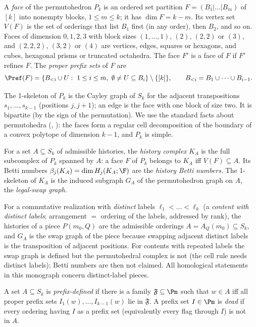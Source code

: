 \begin{definition}\label{def:faces}
A \emph{face} of the permutohedron $P_k$ is an ordered set partition $F=(B_1|\dots|B_m)$ of $[k]$ into nonempty blocks, $1\le m\le k$; it has $\dim F=k-m$. Its vertex set $V(F)$ is the set of orderings that list $B_1$ first (in any order), then $B_2$, and so on. Faces of dimension $0,1,2,3$ with block sizes $(1,\dots,1)$, $(2)$, $(2,2)$ or $(3)$, and $(2,2,2)$, $(3,2)$ or $(4)$ are vertices, edges, squares or hexagons, and cubes, hexagonal prisms or truncated octahedra. The face $F'$ is a face of $F$ if $F'$ refines $F$. The \emph{proper prefix sets} of $F$ are
\[
\Pref(F)=\{B_{<i}\cup U:\ 1\le i\le m,\ \emptyset\neq U\subseteq B_i\}\setminus\{[k]\},\qquad B_{<i}=B_1\cup\dots\cup B_{i-1}.
\]
\end{definition}
\noindent The 1-skeleton of $P_k$ is the Cayley graph of $S_k$ for the adjacent transpositions $s_1,\dots,s_{k-1}$ (positions $j,j{+}1$); an edge is the face with one block of size two. It is bipartite (by the sign of the permutation). We use the standard facts about permutohedra (\cite{Ziegler}, \cite{BjornerBrenti}): the faces form a regular cell decomposition of the boundary of a convex polytope of dimension $k-1$, and $P_k$ is simple.

\begin{definition}\label{def:KA}
For a set $A\subseteq S_k$ of admissible histories, the \emph{history complex} $K_A$ is the full subcomplex of $P_k$ spanned by $A$: a face $F$ of $P_k$ belongs to $K_A$ iff $V(F)\subseteq A$. Its Betti numbers $\beta_j(K_A)=\dim H_j(K_A;\F)$ are the \emph{history Betti numbers}. The 1-skeleton of $K_A$ is the induced subgraph $G_A$ of the permutohedron graph on $A$, the \emph{legal-swap graph}.
\end{definition}
For a commutative realization with \emph{distinct} labels $\ell_1<\dots<\ell_k$ (a \emph{content with distinct labels}; arrangement $=$ ordering of the labels, addressed by rank), the histories of a piece $P(m_0,Q)$ are the admissible orderings $A=A_Q(m_0)\subseteq S_k$, and $G_A$ is the swap graph of the piece because swapping adjacent distinct labels is the transposition of adjacent positions. For contents with repeated labels the swap graph is defined but the permutohedral complex is not (the cell rule needs distinct labels); Betti numbers are then not claimed. All homological statements in this monograph concern distinct-label pieces.

\begin{definition}\label{def:prefix-defined}
A set $A\subseteq S_k$ is \emph{prefix-defined} if there is a family $\mathfrak F\subseteq\Pm$ such that $w\in A$ iff all proper prefix sets $I_1(w),\dots,I_{k-1}(w)$ lie in $\mathfrak F$. A prefix set $I\in\Pm$ is \emph{dead} if every ordering having $I$ as a prefix set (equivalently every flag through $I$) is not in $A$.
\end{definition}

